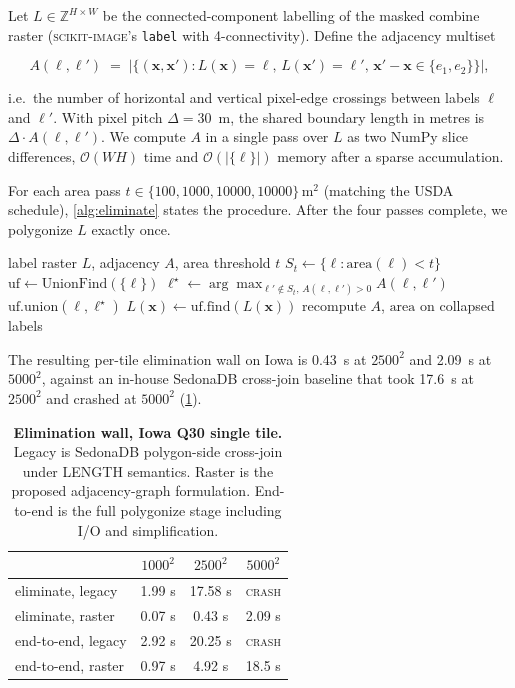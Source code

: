 \documentclass[preprint,12pt]{elsarticle}
\begin{document}
Let $L \in \mathbb{Z}^{H \times W}$ be the connected-component
labelling of the masked combine raster (\textsc{scikit-image}'s
\texttt{label} with 4-connectivity). Define the adjacency multiset

\[
A(\ell, \ell') \;=\; \bigl|\{(\mathbf{x}, \mathbf{x}') :
   L(\mathbf{x})=\ell,\, L(\mathbf{x}')=\ell',\, \mathbf{x}'\!-\!\mathbf{x} \in \{e_1, e_2\}\}\bigr|,
\]

i.e.\ the number of horizontal and vertical pixel-edge crossings between
labels $\ell$ and $\ell'$. With pixel pitch $\Delta = 30$~m, the shared
boundary length in metres is $\Delta \cdot A(\ell, \ell')$. We compute
$A$ in a single pass over $L$ as two NumPy slice differences,
$\mathcal{O}(WH)$ time and $\mathcal{O}(|\{\ell\}|)$ memory after a
sparse accumulation.

For each area pass $t \in \{100, 1000, 10000, 10000\}\,\si{\meter\squared}$
(matching the USDA schedule), \cref{alg:eliminate} states the procedure.
After the four passes complete, we polygonize $L$ exactly once.

\begin{algorithm}[t]
\caption{Raster-side \textsc{Eliminate(LENGTH)} pass}
\label{alg:eliminate}
\begin{algorithmic}[1]
\REQUIRE label raster $L$, adjacency $A$, area threshold $t$
\STATE $S_t \gets \{\ell : \text{area}(\ell) < t\}$
\STATE $\text{uf} \gets \text{UnionFind}(\{\ell\})$
    \STATE $\ell^\star \gets \arg\max_{\ell' \notin S_t,\, A(\ell,\ell')>0} A(\ell, \ell')$
        \STATE $\text{uf.union}(\ell, \ell^\star)$
    \ENDIF
\ENDFOR
\STATE $L(\mathbf{x}) \gets \text{uf.find}(L(\mathbf{x}))$ 
\STATE recompute $A$, $\text{area}$ on collapsed labels
\end{algorithmic}
\end{algorithm}

The resulting per-tile elimination wall on Iowa is 0.43~s at $2500^2$
and 2.09~s at $5000^2$, against an in-house SedonaDB cross-join baseline
that took 17.6~s at $2500^2$ and crashed at $5000^2$
(\cref{tab:eliminate}).

\begin{table}[t]
\centering
\caption{\textbf{Elimination wall, Iowa Q30 single tile.} Legacy is
SedonaDB polygon-side cross-join under \textsc{LENGTH} semantics. Raster
is the proposed adjacency-graph formulation. End-to-end is the full
polygonize stage including I/O and simplification.}
\label{tab:eliminate}
\small
\begin{tabular}{lccc}
\toprule
& $1000^2$ & $2500^2$ & $5000^2$ \\
\midrule
eliminate, legacy   & 1.99 s & 17.58 s & \textsc{crash} \\
eliminate, raster   & 0.07 s & 0.43 s  & 2.09 s \\
end-to-end, legacy  & 2.92 s & 20.25 s & \textsc{crash} \\
end-to-end, raster  & 0.97 s & 4.92 s  & 18.5 s \\
\bottomrule
\end{tabular}
\end{table}
\end{document}
